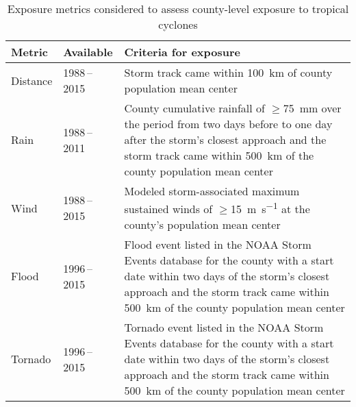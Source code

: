 \begin{table}%
\centering 
\caption{Exposure metrics considered to assess county-level exposure to 
tropical cyclones}
\begin{tabular}{p{1.5cm}p{2.5cm}p{10cm}} 
\toprule
Metric & Available & Criteria for exposure \\ \midrule 
Distance & 1988\,--\,2015 & Storm track came within 100~\si{\kilo\metre} of county population mean center\\ 
Rain & 1988\,--\,2011 & County cumulative rainfall of $\ge$75~\si{\milli\metre} over the period from two days before to 
one day after the storm's closest approach and the storm track came within 500~\si{\kilo\metre} of the county population mean center\\ 
Wind & 1988\,--\,2015 & Modeled storm-associated maximum sustained winds of $\ge$15~\si{\metre\per\second}
at the county's population mean center\\ 
Flood & 1996\,--\,2015 & Flood event listed in the \ac{NOAA} Storm Events database for the county with a start date within two days of the storm's closest approach and the storm track came within 500~\si{\kilo\metre} of the county population mean center \\
Tornado & 1996\,--\,2015 & Tornado event listed in the \ac{NOAA} Storm Events database for the county with a start date within two days of the storm's closest approach and the storm track came within 500~\si{\kilo\metre} of the county population mean center\\
\bottomrule 
\end{tabular} 
\label{tab:exposuremetrics} 
\end{table}

\clearpage


